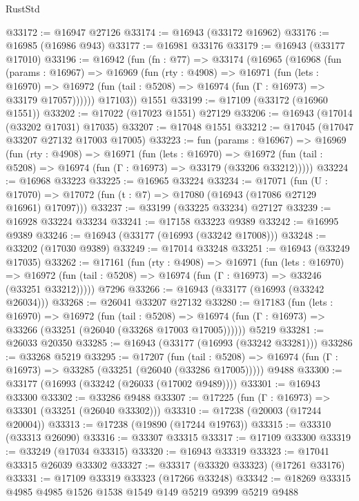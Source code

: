 \begin{lexlean}{RustStd}
\begin{coremodule}
@33172 := @16947 @27126
@33174 := @16943 (@33172 @16962)
@33176 := @16985 (@16986 @943)
@33177 := @16981 @33176
@33179 := @16943 (@33177 @17010)
@33196 := @16942
    (fun (fn : @77) =>
    @33174
      (@16965
        (@16968
          (fun (params : @16967) =>
          @16969
            (fun (rty : @4908) =>
            @16971
              (fun (lets : @16970) =>
              @16972 (fun (tail : @5208) => @16974 (fun (Γ : @16973) => @33179 @17057))))))
        @17103))
    @1551
@33199 := @17109 (@33172 (@16960 @1551))
@33202 := @17022 (@17023 @1551) @27129
@33206 := @16943 (@17014 (@33202 @17031) @17035)
@33207 := @17048 @1551
@33212 := @17045 (@17047 @33207 @27132 @17003 @17005)
@33223 := fun (params : @16967) =>
  @16969
    (fun (rty : @4908) =>
    @16971
      (fun (lets : @16970) =>
      @16972 (fun (tail : @5208) => @16974 (fun (Γ : @16973) => @33179 (@33206 @33212)))))
@33224 := @16968 @33223
@33225 := @16965 @33224
@33234 := @17071
    (fun (U : @17070) => @17072 (fun (t : @7) => @17080 (@16943 (@17086 @27129 @16961) @17097)))
@33237 := @33199 (@33225 @33234) @27127
@33239 := @16928 @33224 @33234
@33241 := @17158 @33223 @9389
@33242 := @16995 @9389
@33246 := @16943 (@33177 (@16993 (@33242 @17008)))
@33248 := @33202 (@17030 @9389)
@33249 := @17014 @33248
@33251 := @16943 (@33249 @17035)
@33262 := @17161
    (fun (rty : @4908) =>
    @16971
      (fun (lets : @16970) =>
      @16972 (fun (tail : @5208) => @16974 (fun (Γ : @16973) => @33246 (@33251 @33212)))))
    @7296
@33266 := @16943 (@33177 (@16993 (@33242 @26034)))
@33268 := @26041 @33207 @27132
@33280 := @17183
    (fun (lets : @16970) =>
    @16972
      (fun (tail : @5208) =>
      @16974 (fun (Γ : @16973) => @33266 (@33251 (@26040 (@33268 @17003 @17005))))))
    @5219
@33281 := @26033 @20350
@33285 := @16943 (@33177 (@16993 (@33242 @33281)))
@33286 := @33268 @5219
@33295 := @17207
    (fun (tail : @5208) => @16974 (fun (Γ : @16973) => @33285 (@33251 (@26040 (@33286 @17005)))))
    @9488
@33300 := @33177 (@16993 (@33242 (@26033 (@17002 @9489))))
@33301 := @16943 @33300
@33302 := @33286 @9488
@33307 := @17225 (fun (Γ : @16973) => @33301 (@33251 (@26040 @33302)))
@33310 := @17238 (@20003 (@17244 @20004))
@33313 := @17238 (@19890 (@17244 @19763))
@33315 := @33310 (@33313 @26090)
@33316 := @33307 @33315
@33317 := @17109 @33300
@33319 := @33249 (@17034 @33315)
@33320 := @16943 @33319
@33323 := @17041 @33315 @26039 @33302
@33327 := @33317 (@33320 @33323) (@17261 @33176)
@33331 := @17109 @33319 @33323 (@17266 @33248)
@33342 := @18269 @33315 @4985 @4985 @1526 @1538 @1549 @149 @5219 @9399 @5219 @9488

\end{coremodule}
\end{lexlean}
